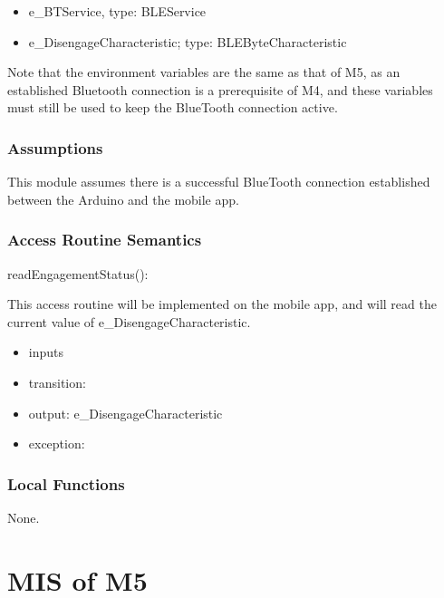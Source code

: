 \documentclass[12pt, titlepage]{article}
\begin{document}
\begin{itemize}
\item e\_BTService, type: BLEService
\item e\_DisengageCharacteristic; type: BLEByteCharacteristic
\end{itemize}

Note that the environment variables are the same as that of M5, as an established Bluetooth connection is a prerequisite of M4, and these variables must still be used to keep the BlueTooth connection active. 

\subsubsection{Assumptions}


This module assumes there is a successful BlueTooth connection established between the Arduino and the mobile app. 

\subsubsection{Access Routine Semantics}


\noindent readEngagementStatus():

This access routine will be implemented on the mobile app, and will read the current value of  e\_DisengageCharacteristic.

\begin{itemize}
\item inputs
\item transition: %
\item output: e\_DisengageCharacteristic
\item exception:  
\end{itemize}

\subsubsection{Local Functions}

None.


\section{MIS of M5 \label{WirelessSignalConnection}} 
\end{document}
